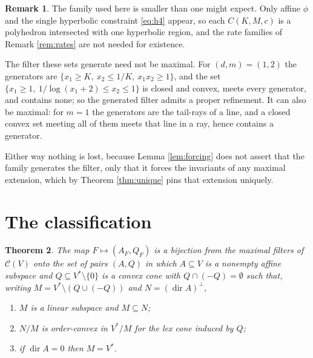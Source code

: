 \documentclass[11pt]{amsart}
\theoremstyle{plain}
\newtheorem{theorem}{Theorem}[section]
\theoremstyle{definition}
\newtheorem{remark}[theorem]{Remark}
\DeclareMathOperator{\dir}{dir}
\newcommand{\CC}{\mathscr{C}}
\newcommand{\Vs}{V^{*}}
\begin{document}
\begin{remark}\label{rem:polyhedral}
The family used here is smaller than one might expect. Only affine $\phi$ and the single hyperbolic constraint \eqref{eq:h4} appear, so each $C(K,M,c)$ is a polyhedron intersected with one hyperbolic region, and the rate families of Remark \ref{rem:rates} are not needed for existence.

The filter these sets generate need not be maximal. For $(d,m)=(1,2)$ the generators are $\{x_1\ge K,\ x_2\le1/K,\ x_1x_2\ge1\}$, and the set $\{x_1\ge1,\ 1/\log(x_1+2)\le x_2\le1\}$ is closed and convex, meets every generator, and contains none; so the generated filter admits a proper refinement. It can also be maximal: for $m=1$ the generators are the tail-rays of a line, and a closed convex set meeting all of them meets that line in a ray, hence contains a generator.

Either way nothing is lost, because Lemma \ref{lem:forcing} does not assert that the family generates the filter, only that it forces the invariants of any maximal extension, which by Theorem \ref{thm:unique} pins that extension uniquely.
\end{remark}

\section{The classification}\label{sec:primal}

\begin{theorem}\label{thm:dual}
The map $F\mapsto(A_F,Q_F)$ is a bijection from the maximal filters of $\CC(V)$ onto the set of pairs $(A,Q)$ in which $A\subseteq V$ is a nonempty affine subspace and $Q\subseteq\Vs\setminus\{0\}$ is a convex cone with $Q\cap(-Q)=\emptyset$ such that, writing $M=\Vs\setminus(Q\cup(-Q))$ and $N=(\dir A)^{\perp}$,
\begin{enumerate}
\item $M$ is a linear subspace and $M\subseteq N$;
\item $N/M$ is order-convex in $\Vs/M$ for the lex cone induced by $Q$;
\item if $\dir A=0$ then $M=\Vs$.
\end{enumerate}
\end{theorem}
\end{document}
